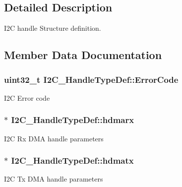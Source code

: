 \subsection{Detailed Description}
I2C handle Structure definition. 

\subsection{Member Data Documentation}
\subsubsection[{\texorpdfstring{Error\+Code}{ErrorCode}}]{ uint32\+\_\+t I2\+C\+\_\+\+Handle\+Type\+Def\+::\+Error\+Code}\hypertarget{struct_i2_c___handle_type_def_a15acfdb4bc2e1da9470e9823f127d8f9}{}\label{struct_i2_c___handle_type_def_a15acfdb4bc2e1da9470e9823f127d8f9}
I2C Error code 
\subsubsection[{\texorpdfstring{hdmarx}{hdmarx}}]{$\ast$ I2\+C\+\_\+\+Handle\+Type\+Def\+::hdmarx}\hypertarget{struct_i2_c___handle_type_def_ad1778574d987009683c8120bd16aa9cf}{}\label{struct_i2_c___handle_type_def_ad1778574d987009683c8120bd16aa9cf}
I2C Rx D\+MA handle parameters 
\subsubsection[{\texorpdfstring{hdmatx}{hdmatx}}]{$\ast$ I2\+C\+\_\+\+Handle\+Type\+Def\+::hdmatx}\hypertarget{struct_i2_c___handle_type_def_adb4429cdf02e5564464a1517229826b6}{}\label{struct_i2_c___handle_type_def_adb4429cdf02e5564464a1517229826b6}
I2C Tx D\+MA handle parameters 
